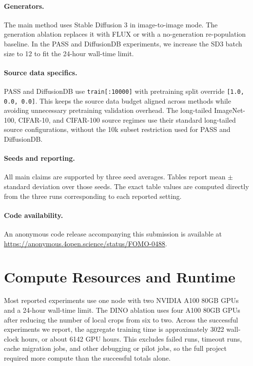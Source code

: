 \documentclass{article}
\begin{document}
\paragraph{Generators.}
The main method uses Stable Diffusion 3 in image-to-image mode. The generation ablation replaces it with FLUX or with a no-generation re-population baseline. In the PASS and DiffusionDB experiments, we increase the SD3 batch size to 12 to fit the 24-hour wall-time limit.

\paragraph{Source data specifics.}
PASS and DiffusionDB use \texttt{train[:10000]} with pretraining split override \texttt{[1.0, 0.0, 0.0]}. This keeps the source data budget aligned across methods while avoiding unnecessary pretraining validation overhead. The long-tailed ImageNet-100, CIFAR-10, and CIFAR-100 source regimes use their standard long-tailed source configurations, without the 10k subset restriction used for PASS and DiffusionDB.

\paragraph{Seeds and reporting.}
All main claims are supported by three seed averages. Tables report mean $\pm$ standard deviation over those seeds. The exact table values are computed directly from the three runs corresponding to each reported setting.

\paragraph{Code availability.}
An anonymous code release accompanying this submission is available at \url{https://anonymous.4open.science/status/FOMO-0488}.

\section{Compute Resources and Runtime}
\label{app:compute}
Most reported experiments use one node with two NVIDIA A100 80GB GPUs and a 24-hour wall-time limit. The DINO ablation uses four A100 80GB GPUs after reducing the number of local crops from six to two. Across the successful experiments we report, the aggregate training time is approximately 3022 wall-clock hours, or about 6142 GPU hours. This excludes failed runs, timeout runs, cache migration jobs, and other debugging or pilot jobs, so the full project required more compute than the successful totals alone.
\end{document}
